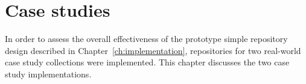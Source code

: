 \chapter{Case studies\label{ch:case-studies}}


In order to assess the overall effectiveness of the prototype simple repository design described in Chapter~\ref{ch:implementation}, repositories for two real-world case study collections were implemented. This chapter discusses the two case study implementations.

\begin{comment}
 http://www.cs.wustl.edu/~schmidt/PDF/design-principles4.pdf
\textbf{Please see
this -> \url{https://github.s3.amazonaws.com/media/progit.en.pdf} on page 173
for a really neat way of presenting diagrams ***}
\end{comment}




